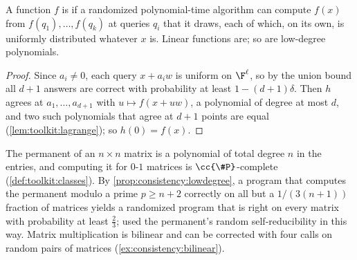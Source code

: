 \begin{refsection}
A function $f$ is  if a randomized polynomial-time algorithm can compute $f(x)$ from $f(q_1),\dots,f(q_k)$ at queries $q_i$ that it draws, each of which, on its own, is uniformly distributed whatever $x$ is. Linear functions are; so are low-degree polynomials.


\begin{proof}
Since $a_i\ne0$, each query $x+a_iw$ is uniform on $\F^\ell$, so by the union bound all $d+1$ answers are correct with probability at least $1-(d+1)\delta$. Then $h$ agrees at $a_1,\dots,a_{d+1}$ with $u\mapsto f(x+uw)$, a polynomial of degree at most $d$, and two such polynomials that agree at $d+1$ points are equal (\cref{lem:toolkit:lagrange}); so $h(0)=f(x)$.
\end{proof}

The permanent of an $n\times n$ matrix is a polynomial of total degree $n$ in the entries, and computing it for $0$-$1$ matrices is $\cc{\#P}$-complete \parencite{Valiant1979} (\cref{def:toolkit:classes}). By \cref{prop:consistency:lowdegree}, a program that computes the permanent modulo a prime $p\ge n+2$ correctly on all but a $1/(3(n+1))$ fraction of matrices yields a randomized program that is right on every matrix with probability at least $\frac23$; \textcite{Lipton1991} used the permanent's random self-reducibility in this way. Matrix multiplication is bilinear and can be corrected with four calls on random pairs of matrices (\cref{ex:consistency:bilinear}).


\end{refsection}
